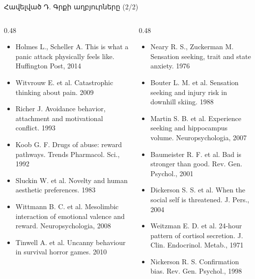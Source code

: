 \begin{frame}{Հավելված Դ. Գրքի աղբյուրները (2/2)}
  \scriptsize
  \begin{columns}[T]
    \begin{column}{0.48\textwidth}
      \begin{itemize}\setlength{\itemsep}{0.2mm}
        \item Holmes L., Scheller A. This is what a panic attack physically feels like. Huffington Post, 2014
        \item Witvrouw E. et al. Catastrophic thinking about pain. 2009
        \item Richer J. Avoidance behavior, attachment and motivational conflict. 1993
        \item Koob G. F. Drugs of abuse: reward pathways. Trends Pharmacol. Sci., 1992
        \item Sluckin W. et al. Novelty and human aesthetic preferences. 1983
        \item Wittmann B. C. et al. Mesolimbic interaction of emotional valence and reward. Neuropsychologia, 2008
        \item Tinwell A. et al. Uncanny behaviour in survival horror games. 2010
      \end{itemize}
    \end{column}
    \begin{column}{0.48\textwidth}
      \begin{itemize}\setlength{\itemsep}{0.2mm}
        \item Neary R. S., Zuckerman M. Sensation seeking, trait and state anxiety. 1976
        \item Bouter L. M. et al. Sensation seeking and injury risk in downhill skiing. 1988
        \item Martin S. B. et al. Experience seeking and hippocampus volume. Neuropsychologia, 2007
        \item Baumeister R. F. et al. Bad is stronger than good. Rev. Gen. Psychol., 2001
        \item Dickerson S. S. et al. When the social self is threatened. J. Pers., 2004
        \item Weitzman E. D. et al. 24-hour pattern of cortisol secretion. J. Clin. Endocrinol. Metab., 1971
        \item Nickerson R. S. Confirmation bias. Rev. Gen. Psychol., 1998
      \end{itemize}
    \end{column}
  \end{columns}
\end{frame}
